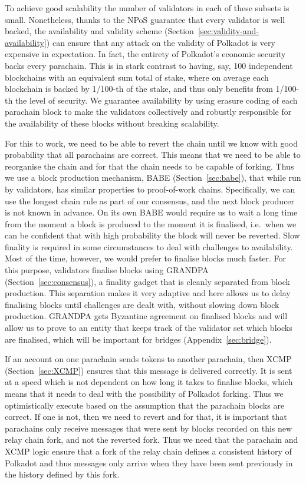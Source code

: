To achieve good scalability the number of validators in each of these subsets is small. Nonetheless, thanks to the NPoS guarantee that every validator is well backed, the availability and validity scheme (Section~\ref{sec:validity-and-availability}) can ensure that any attack on the validity of Polkadot is very expensive in expectation. In fact, the entirety of Polkadot's economic security backs every parachain. This is in stark contrast to having, say, 100 independent blockchains with an equivalent sum total of stake, where on average each blockchain is backed by 1/100-th of the stake, and thus only benefits from 1/100-th the level of security. We guarantee availability by using erasure coding of each parachain block to make the validators collectively and robustly responsible for the availability of these blocks without breaking scalability.

For this to work, we need to be able to revert the chain until we know with good probability that all parachains are correct. This means that we need to be able to reorganise the chain and for that the chain needs to be capable of forking. Thus we use a block production mechanism, BABE (Section~\ref{sec:babe}), that while run by validators, has similar properties to proof-of-work chains. Specifically, we can use the longest chain rule as part of our consensus, and the next block producer is not known in advance. On its own BABE would require us to wait a long time from the moment a block is produced to the moment it is finalised, i.e.~when we can be confident that with high probability the block will never be reverted. Slow finality is required in some circumstances to deal with challenges to availability. Most of the time, however, we would prefer to finalise blocks much faster.  For this purpose, validators finalise blocks using GRANDPA (Section~\ref{sec:consensus}), a finality gadget that is cleanly separated from block production. This separation makes it very adaptive and here allows us to delay finalising blocks until challenges are dealt with, without slowing down block production. GRANDPA gets Byzantine agreement on finalised blocks and will allow us to prove to an entity that keeps track of the validator set which blocks are finalised, which will be important for bridges (Appendix~\ref{sec:bridge}).

If an account on one parachain sends tokens to another parachain, then XCMP (Section~\ref{sec:XCMP}) ensures that this message is delivered correctly. It is sent at a speed which is not dependent on how long it takes to finalise blocks, which means that it needs to deal with the possibility of Polkadot forking. Thus we optimistically execute based on the assumption that the parachain blocks are correct. If one is not, then we need to revert and for that, it is important that parachains only receive messages that were sent by blocks recorded on this new relay chain fork, and not the reverted fork. Thus we need that  the parachain and XCMP logic ensure that a fork of the relay chain defines a consistent history of Polkadot and thus messages only arrive when they have been sent previously in the history defined by this fork. 

